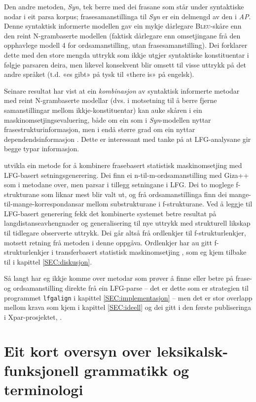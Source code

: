 \documentclass[11pt,a4paper,oneside,draft]{report}
\newcommand{\Bleu}{\textsc{Bleu}}
\begin{document}
Den andre metoden, \emph{Syn}, tek berre med dei frasane som står under
syntaktiske nodar i eit parsa korpus; frasesamanstillinga til \emph{Syn} er
ein delmengd av den i \emph{AP}. Denne syntaktisk informerte modellen gav
ein mykje dårlegare \Bleu-skåre enn den reint N-grambaserte modellen
(faktisk dårlegare enn omsetjingane frå den opphavlege modell 4 for
ordsamanstilling, utan frasesamanstilling). Dei forklarer dette med
den store mengda uttrykk som ikkje utgjer syntaktiske konstituentar i
følgje parsaren deira, men likevel konsekvent blir omsett til visse
uttrykk på det andre språket (t.d. «es gibt» på tysk til «there is» på
engelsk). 

Seinare resultat har vist at ein \emph{kombinasjon} av syntaktisk
informerte metodar med reint N-grambaserte modellar (dvs. i motsetning
til å berre fjerne samanstillingar mellom ikkje-konstituentar) kan
auke skåren i ein maskinomsetjingsevaluering, både om ein som i
\emph{Syn}-modellen nyttar frasestrukturinformasjon, men i endå større
grad om ein nyttar dependendsinformasjon
\citep{tinsley2007ept,hearne2008ccd}. Dette er interessant med tanke
på at LFG-analysane gir begge typar informasjon.

\citet{riezler2006gmt} utvikla ein metode for å kombinere frasebasert
statistisk maskinomsetjing med LFG-basert setningsgenerering. Dei finn
ei n-til-m-ordsamanstilling med Giza++ som i metodane over, men parsar
i tillegg setningane i LFG. Dei to moglege f-strukturane som liknar
mest blir valt ut, og frå ordsamanstillinga finn dei
mange-til-mange-korrespondansar mellom substrukturane i
f-strukturane. Ved å leggje til LFG-basert generering fekk det
kombinerte systemet betre resultat på langdistanseavhengnader og
generalisering til nye uttrykk med strukturell likskap til tidlegare
observerte uttrykk. Dei går altså frå ordlenkjer til
f-strukturlenkjer, motsett retning frå metoden i denne
oppgåva. Ordlenkjer har au gitt f-strukturlenkjer i transferbasert
statistisk maskinomsetjing
\citep{graham2010dsl,graham2009osr,graham2009fts}, som eg kjem tilbake
til i kapittel \ref{SEC:diskusjon}.

Så langt har eg ikkje komme over metodar som prøver å finne eller
betre på frase- og ordsamanstilling direkte frå ein LFG-parse -- det
er dette som er strategien til programmet \texttt{lfgalign} i kapittel
\ref{SEC:implementasjon} -- men det er stor overlapp mellom krava som
kjem i kapittel \ref{SEC:ideell} og dei gitt i den første publiseringa
i Xpar-prosjektet, \citet{dyvik2009lmp}.

\section{Eit kort oversyn over leksikalsk-funksjonell grammatikk og terminologi}
\label{sec-2.2}
\end{document}
